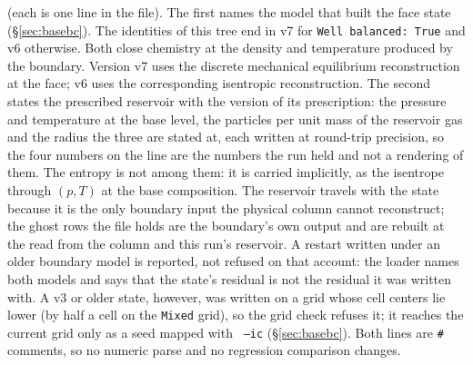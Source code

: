 \documentclass[english,a4paper]{my_memo}
\begin{document}
\noindent (each is one line in the file). The first names the model that built the face state
(\S\ref{sec:basebc}). The identities of this tree end in v7 for
\texttt{Well balanced: True} and v6 otherwise. Both close chemistry at the density and temperature produced by the
boundary. Version v7
uses the discrete mechanical equilibrium reconstruction at the face;
v6 uses the corresponding isentropic reconstruction. The second states
the prescribed reservoir with the version of its prescription: the pressure
and temperature at the base level, the particles per unit mass of the
reservoir gas and the radius the three are stated at, each written at
round-trip precision, so the four numbers on the line are the numbers the run
held and not a rendering of them.  The entropy is not among them: it is
carried implicitly, as the isentrope through $(p, T)$ at the base
composition.  The reservoir travels with the state because it is the only
boundary input the physical column cannot reconstruct; the ghost rows the
file holds are the boundary's own output and are rebuilt at the read from the
column and this run's reservoir.  A restart written under an older boundary
model is reported, not refused on that account: the loader names both models
and says that the state's residual is not the residual it was written with.
A v3 or older state, however, was written on a grid whose cell centers lie
lower (by half a cell on the \texttt{Mixed} grid), so the grid check refuses it; it reaches the current grid only as a
seed mapped with ~\texttt{--ic}
(\S\ref{sec:basebc}).  Both
lines are \texttt{\#} comments, so no numeric parse and no regression
comparison changes.
\end{document}
